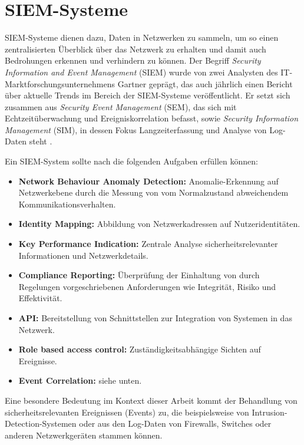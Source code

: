 \section{SIEM-Systeme}

\label{sec_basics_siem}

SIEM-Systeme dienen dazu, Daten in Netzwerken zu sammeln, um so einen zentralisierten Überblick über das Netzwerk zu erhalten und damit auch Bedrohungen erkennen und verhindern zu können. 
Der Begriff \textit{Security Information and Event Management} (SIEM) wurde von zwei Analysten des IT-Marktforschungsunternehmens Gartner geprägt, das auch jährlich einen Bericht über aktuelle Trends im Bereich der SIEM-Systeme veröffentlicht.
Er setzt sich zusammen aus \textit{Security Event Management} (SEM), das sich mit Echtzeitüberwachung und Ereigniskorrelation befasst, sowie \textit{Security Information Management} (SIM), in dessen Fokus Langzeiterfassung und Analyse von Log-Daten steht \cite{gartner2011}. 

Ein SIEM-System sollte nach \cite{detken2015} die folgenden Aufgaben erfüllen können: 
\begin{itemize}
	\item \textbf{Network Behaviour Anomaly Detection:} Anomalie-Erkennung auf Netzwerkebene durch die Messung von vom Normalzustand abweichendem Kommunikationsverhalten.
	\item \textbf{Identity Mapping:} Abbildung von Netzwerkadressen auf Nutzeridentitäten. 
	\item \textbf{Key Performance Indication:} Zentrale Analyse sicherheitsrelevanter Informationen und Netzwerkdetails.
	\item \textbf{Compliance Reporting:} Überprüfung der Einhaltung von durch Regelungen vorgeschriebenen Anforderungen wie Integrität, Risiko und Effektivität.
	\item \textbf{API:} Bereitstellung von Schnittstellen zur Integration von Systemen in das Netzwerk.
	\item \textbf{Role based access control:} Zuständigkeitsabhängige Sichten auf Ereignisse.
  \item \textbf{Event Correlation:} siehe unten.
\end{itemize} 

Eine besondere Bedeutung im Kontext dieser Arbeit kommt der Behandlung von sicherheitsrelevanten Ereignissen (Events) zu, die beispielsweise von Intrusion-Detection-Systemen oder aus den Log-Daten von Firewalls, Switches oder anderen Netzwerkgeräten stammen können. 

